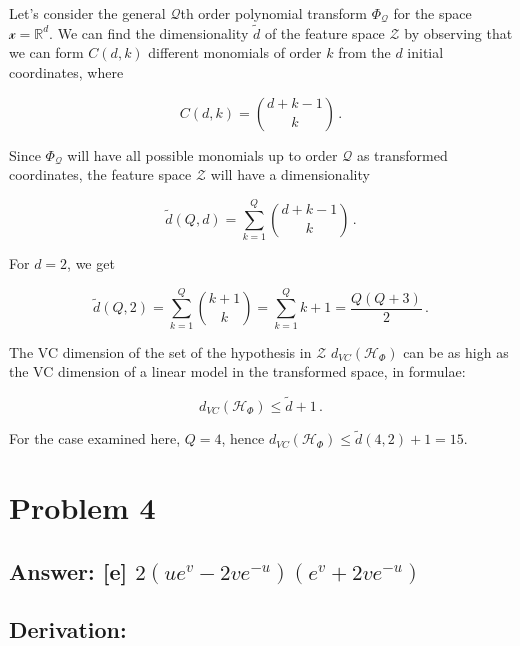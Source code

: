 \documentclass[11pt]{article}
\begin{document}
Let's consider the general \(\mathcal{Q}\)th order polynomial transform
\(\Phi_\mathcal{Q}\) for the space \(\mathcal{x}=\mathbb{R}^d\). We can
find the dimensionality \(\tilde{d}\) of the feature space
\(\mathcal{Z}\) by observing that we can form \(C(d,k)\) different
monomials of order \(k\) from the \(d\) initial coordinates, where

\begin{equation}
C(d,k)={d+k-1 \choose k}\,.
\end{equation}

Since \(\Phi_\mathcal{Q}\) will have all possible monomials up to order
\(\mathcal{Q}\) as transformed coordinates, the feature space
\(\mathcal{Z}\) will have a dimensionality

\begin{equation}
\tilde{d}(Q,d)=\sum^Q_{k=1}{d+k-1 \choose k}\,.
\end{equation}

For \(d=2\), we get

\begin{equation}
\tilde{d}(Q,2)=\sum^Q_{k=1}{k+1 \choose k}= \sum^Q_{k=1} k+1 = \frac{Q(Q+3)}{2} \,.
\end{equation}

The VC dimension of the set of the hypothesis in \(\mathcal{Z}\)
\(d_{VC}(\mathcal{H}_{\Phi})\) can be as high as the VC dimension of a
linear model in the transformed space, in formulae:

\begin{equation}
d_{VC}(\mathcal{H}_{\Phi})\le\tilde{d}+1\,.
\end{equation}

For the case examined here, \(Q=4\), hence
\(d_{VC}(\mathcal{H}_{\Phi})\le \tilde{d}(4,2)+1=15\).

    \hypertarget{problem-4}{%
\section{Problem 4}\label{problem-4}}

\hypertarget{answer-e-2uev-2ve-uev2ve-u}{%
\subsection{\texorpdfstring{Answer: {[}e{]}
\(2(ue^v-2ve^{-u})(e^v+2ve^{-u})\)}{Answer: {[}e{]} 2(ue\^{}v-2ve\^{}\{-u\})(e\^{}v+2ve\^{}\{-u\})}}\label{answer-e-2uev-2ve-uev2ve-u}}

\hypertarget{derivation}{%
\subsection{Derivation:}\label{derivation}}
\end{document}
